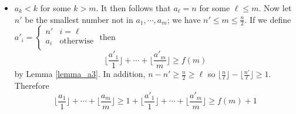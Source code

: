 \documentclass[11pt,a4paper]{article}
\begin{document}
\begin{enumerate}
\begin{itemize}
			\item $a_k < k$ for some $k > m$. 
			It then follows that $a_{\ell}=n$ for some $\ell\le m$. 
			Now let $n'$ be the smallest number not in $a_1, \cdots, a_m$; we have $n'\le m\le \frac n2$. 
			If we define $a'_i = \begin{cases}
				n' & i=\ell\\
				a_i & \text{otherwise}\\
			\end{cases}$
		    then 
		    \[
		    \lfloor \frac {a'_1}{1}\rfloor + \cdots + \lfloor \frac {a'_m}{m}\rfloor\ge f(m)
		    \]
		    by Lemma \ref{lemma_a3}. In addition, $n - n'\ge \frac{n}{2}\ge \ell$ so 
		    $\lfloor \frac{n}{\ell}\rfloor - \lfloor \frac{n'}{\ell}\rfloor \ge 1$. 
		    Therefore 
		    \[
		    \lfloor \frac {a_1}{1}\rfloor + \cdots + \lfloor \frac {a_m}{m}\rfloor
		    \ge 
		    1 + \lfloor \frac {a'_1}{1}\rfloor + \cdots + \lfloor \frac {a'_m}{m}\rfloor
		    \ge f(m) + 1
		    \]
		    
		\end{itemize}
	\end{enumerate}
	
\end{document}
